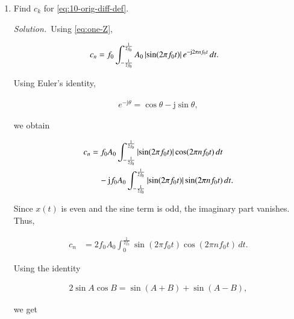 \documentclass[journal,12pt,twocolumn]{IEEEtran}
\renewcommand\thesection{\arabic{section}}
\newcommand{\jj}{\mathrm{j}}
\providecommand{\solution}{\par\noindent\textit{Solution.}\ }
\begin{document}
\begin{enumerate}[
    label=\thesection.\arabic*,
    ref=\thesection.\theenumi
]
Consequently, all terms in the summation vanish except
the term for which $k=n$. Therefore,

\begin{align}
    &\int_{-\frac{1}{2f_0}}^{\frac{1}{2f_0}}
    x(t)e^{-\jj2\pi nf_0t}\,dt
    \nonumber\\
    &=\frac{c_n}{f_0}.
\end{align}

Hence,

\begin{align}
    \boxed{
    c_n=f_0\int_{-\frac{1}{2f_0}}^{\frac{1}{2f_0}}
    x(t)e^{-\jj2\pi nf_0t}\,dt
    }.
\end{align}


\item Find $c_k$ for \eqref{eq:10-orig-diff-def}.

\solution Using \eqref{eq:one-Z},

\begin{align}
    c_n
    &=f_0\int_{-\frac{1}{2f_0}}^{\frac{1}{2f_0}}
    A_0\abs{\sin(2\pi f_0t)}
    e^{-\jj2\pi nf_0t}\,dt.
\end{align}

Using Euler's identity,

\begin{align}
    e^{-\jj\theta}=\cos\theta-\jj\sin\theta,
\end{align}

we obtain

\begin{align}
    c_n
    &=f_0A_0\int_{-\frac{1}{2f_0}}^{\frac{1}{2f_0}}
    \abs{\sin(2\pi f_0t)}
    \cos(2\pi nf_0t)\,dt
    \nonumber\\
    &\quad-\jj f_0A_0
    \int_{-\frac{1}{2f_0}}^{\frac{1}{2f_0}}
    \abs{\sin(2\pi f_0t)}
    \sin(2\pi nf_0t)\,dt.
\end{align}

Since $x(t)$ is even and the sine term is odd, the
imaginary part vanishes. Thus,

\begin{align}
    c_n
    &=2f_0A_0\int_0^{\frac{1}{2f_0}}
    \sin(2\pi f_0t)\cos(2\pi nf_0t)\,dt.
\end{align}

Using the identity

\begin{align}
    2\sin A\cos B=\sin(A+B)+\sin(A-B),
\end{align}

we get


\end{enumerate}
\end{document}
